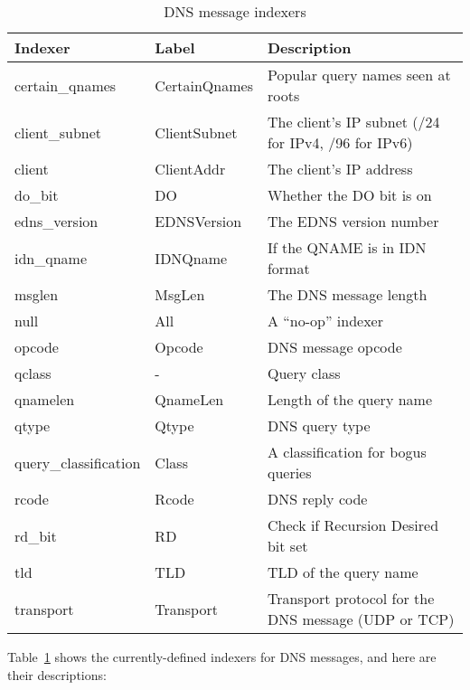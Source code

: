 \documentclass{report}
\begin{document}
\begin{table}
\begin{center}
\begin{tabular}{|lll|}
\hline
Indexer & Label & Description \\
\hline 
certain\_qnames & CertainQnames & Popular query names seen at roots \\
client\_subnet & ClientSubnet & The client's IP subnet (/24 for IPv4, /96 for IPv6) \\
client & ClientAddr & The client's IP address \\
do\_bit & DO & Whether the DO bit is on \\
edns\_version & EDNSVersion & The EDNS version number \\
idn\_qname & IDNQname & If the QNAME is in IDN format \\
msglen & MsgLen & The DNS message length \\
null & All & A ``no-op'' indexer \\
opcode & Opcode & DNS message opcode \\
qclass & - & Query class \\
qnamelen & QnameLen & Length of the query name \\
qtype & Qtype & DNS query type \\
query\_classification & Class & A classification for bogus queries \\
rcode & Rcode & DNS reply code \\
rd\_bit & RD & Check if Recursion Desired bit set \\
tld & TLD & TLD of the query name \\
transport & Transport & Transport protocol for the DNS message (UDP or TCP) \\
\hline
\end{tabular}
\caption{\label{tbl-dns-indexers}DNS message indexers}
\end{center}
\end{table}

Table~\ref{tbl-dns-indexers} shows the currently-defined indexers
for DNS messages, and here are their descriptions:
\end{document}
